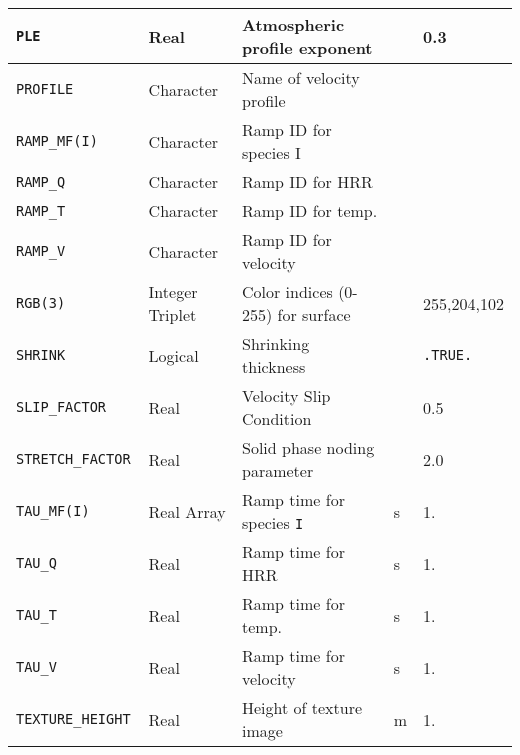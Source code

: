 \documentclass[11pt]{book}
\newcommand{\ct}{\tt\small}
\begin{document}
\begin{longtable}{|l|l|l|l|l|}
{\ct PLE}                             & Real            & Atmospheric profile exponent      &                     & 0.3                     \\ \hline
{\ct PROFILE}                         & Character       & Name of velocity profile          &                     &                         \\ \hline
{\ct RAMP\_MF(I)}                     & Character       & Ramp ID for species I             &                     &                         \\ \hline
{\ct RAMP\_Q}                         & Character       & Ramp ID for HRR                   &                     &                         \\ \hline
{\ct RAMP\_T}                         & Character       & Ramp ID for temp.                 &                     &                         \\ \hline
{\ct RAMP\_V}                         & Character       & Ramp ID for velocity              &                     &                         \\ \hline
{\ct RGB(3)}                          & Integer Triplet & Color indices (0-255) for surface &                     & \small 255,204,102      \\ \hline
{\ct SHRINK}                          & Logical         & Shrinking thickness               &                     & {\ct .TRUE.}            \\ \hline
{\ct SLIP\_FACTOR    }                & Real            & Velocity Slip Condition           &                     & 0.5                     \\ \hline
{\ct STRETCH\_FACTOR    }             & Real            & Solid phase noding parameter      &                     & 2.0                     \\ \hline
{\ct TAU\_MF(I)}                      & Real Array      & Ramp time for species {\ct I}     & s                   & 1.     \\ \hline
{\ct TAU\_Q}                          & Real            & Ramp time for HRR                 & s                   & 1.     \\ \hline
{\ct TAU\_T}                          & Real            & Ramp time for temp.               & s                   & 1.     \\ \hline
{\ct TAU\_V}                          & Real            & Ramp time for velocity            & s                   & 1.     \\ \hline
{\ct TEXTURE\_HEIGHT}                 & Real            & Height of texture image           & m                   & 1.     \\ \hline

\end{longtable}
\end{document}
